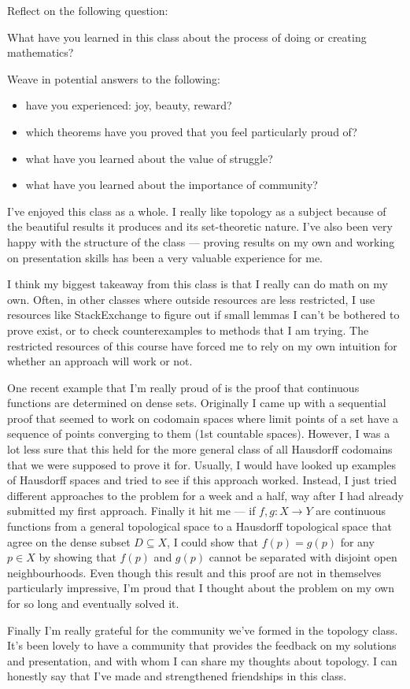 \documentclass[12 pt, letterpaper]{hmcpset}
\begin{document}
\begin{problem}
	Reflect on the following question:

	What have you learned in this class about the process of doing or creating mathematics?

	Weave in potential answers to the following:
	\begin{itemize}
		\item have you experienced: joy, beauty, reward?
		\item which theorems have you proved that you feel particularly proud of?
		\item what have you learned about the value of struggle?
		\item what have you learned about the importance of community?
	\end{itemize}
\end{problem}

\begin{solution}
	I've enjoyed this class as a whole. I really like topology as a subject because of the beautiful results it produces and its set-theoretic nature. I've also been very happy with the structure of the class --- proving results on my own and working on presentation skills has been a very valuable experience for me.

	I think my biggest takeaway from this class is that I really can do math on my own. Often, in other classes where outside resources are less restricted, I use  resources like StackExchange to figure out if small lemmas I can't be bothered to prove exist, or to check counterexamples to methods that I am trying. The restricted resources of this course have forced me to rely on my own intuition for whether an approach will work or not.

	One recent example that I'm really proud of is the proof that continuous functions are determined on dense sets. Originally I came up with a sequential proof that seemed to work on codomain spaces where limit points of a set have a sequence of points converging to them (1st countable spaces). However, I was a lot less sure that this held for the more general class of all Hausdorff codomains that we were supposed to prove it for. Usually, I would have looked up examples of Hausdorff spaces and tried to see if this approach worked. Instead, I just tried different approaches to the problem for a week and a half, way after I had already submitted my first approach. Finally it hit me --- if $f, g : X \to Y$ are continuous functions from a general topological space to a Hausdorff topological space that agree on the dense subset $D \subseteq X$, I could show that $f(p) = g(p)$ for any $p \in X$ by showing that $f(p)$ and $g(p)$ cannot be separated with disjoint open neighbourhoods. Even though this result and this proof are not in themselves particularly impressive, I'm proud that I thought about the problem on my own for so long and eventually solved it.

	Finally I'm really grateful for the community we've formed in the topology class. It's been lovely to have a community that provides the feedback on my solutions and presentation, and with whom I can share my thoughts about topology. I can honestly say that I've made and strengthened friendships in this class.
\end{solution}
\end{document}

